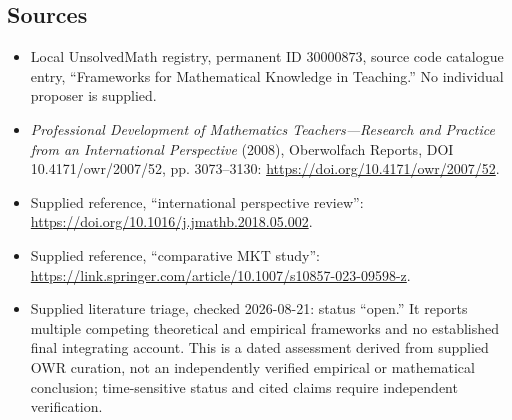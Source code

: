 \documentclass[11pt]{article}
\begin{document}
\subsection{Sources}
\begin{itemize}
\item Local UnsolvedMath registry, permanent ID \(30000873\), source code catalogue entry, ``Frameworks for Mathematical Knowledge in Teaching.'' No individual proposer is supplied.
\item \emph{Professional Development of Mathematics Teachers---Research and Practice from an International Perspective} (2008), Oberwolfach Reports, DOI 10.4171/owr/2007/52, pp. 3073--3130: \url{https://doi.org/10.4171/owr/2007/52}.
\item Supplied reference, ``international perspective review'': \url{https://doi.org/10.1016/j.jmathb.2018.05.002}.
\item Supplied reference, ``comparative MKT study'': \url{https://link.springer.com/article/10.1007/s10857-023-09598-z}.
\item Supplied literature triage, checked 2026-08-21: status ``open.'' It reports multiple competing theoretical and empirical frameworks and no established final integrating account. This is a dated assessment derived from supplied OWR curation, not an independently verified empirical or mathematical conclusion; time-sensitive status and cited claims require independent verification.
\end{itemize}
\end{document}
